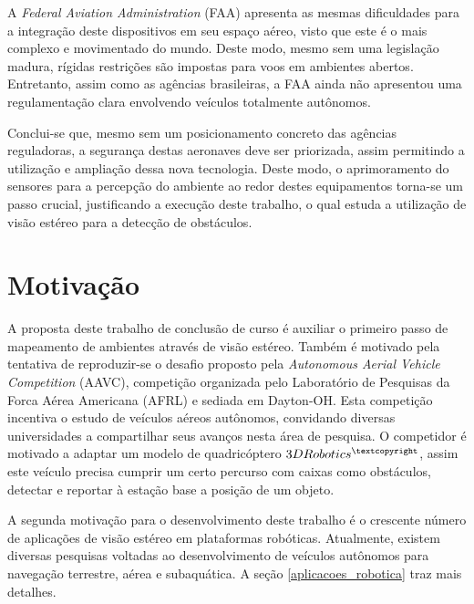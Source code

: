A \textit{Federal Aviation Administration} (FAA) apresenta as mesmas dificuldades para a integração deste dispositivos em seu espaço aéreo, visto que este é o mais complexo e movimentado do mundo. Deste modo, mesmo sem uma legislação madura, rígidas restrições são impostas para voos em ambientes abertos. Entretanto, assim como as agências brasileiras, a FAA ainda não apresentou uma regulamentação clara envolvendo veículos totalmente autônomos. 

Conclui-se que, mesmo sem um posicionamento concreto das agências reguladoras, a segurança destas aeronaves deve ser priorizada, assim permitindo a utilização e ampliação dessa nova tecnologia. Deste modo, o aprimoramento do sensores para a percepção do ambiente ao redor destes equipamentos torna-se um passo crucial, justificando a execução deste trabalho, o qual estuda a utilização de visão estéreo para a detecção de obstáculos.


\section{Motivação}

A proposta deste trabalho de conclusão de curso é auxiliar o primeiro passo de mapeamento de ambientes através de visão estéreo. Também é motivado pela tentativa de reproduzir-se o desafio proposto pela \textit{Autonomous Aerial Vehicle Competition} (AAVC)\cite{AAVC}, competição organizada pelo Laboratório de Pesquisas da Forca Aérea Americana (AFRL) e sediada em Dayton-OH. Esta competição incentiva o estudo de veículos aéreos autônomos, convidando diversas universidades a compartilhar seus avanços nesta área de pesquisa. O competidor é motivado a adaptar um modelo de quadricóptero $3DRobotics^{\textcopyright}$, assim este veículo precisa cumprir um certo percurso com caixas como obstáculos, detectar e reportar à estação base a posição de um objeto.

A segunda motivação para o desenvolvimento deste trabalho é o crescente número de aplicações de visão estéreo em plataformas robóticas. Atualmente, existem diversas pesquisas voltadas ao desenvolvimento de veículos autônomos para navegação terrestre, aérea e subaquática. A seção \ref{aplicacoes_robotica} traz mais detalhes.



